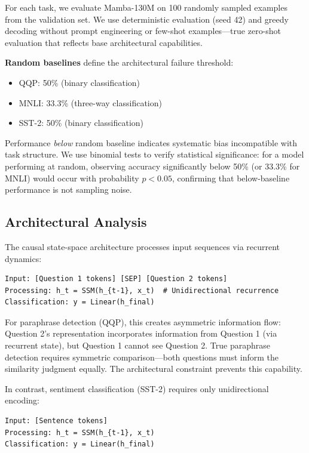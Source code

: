 For each task, we evaluate Mamba-130M on 100 randomly sampled examples from the validation set. We use deterministic evaluation (seed 42) and greedy decoding without prompt engineering or few-shot examples---true zero-shot evaluation that reflects base architectural capabilities.

\textbf{Random baselines} define the architectural failure threshold:
\begin{itemize}
\item QQP: 50\% (binary classification)
\item MNLI: 33.3\% (three-way classification)
\item SST-2: 50\% (binary classification)
\end{itemize}

Performance \textit{below} random baseline indicates systematic bias incompatible with task structure. We use binomial tests to verify statistical significance: for a model performing at random, observing accuracy significantly below 50\% (or 33.3\% for MNLI) would occur with probability $p < 0.05$, confirming that below-baseline performance is not sampling noise.

\subsection{Architectural Analysis}

The causal state-space architecture processes input sequences via recurrent dynamics:

\begin{verbatim}
Input: [Question 1 tokens] [SEP] [Question 2 tokens]
Processing: h_t = SSM(h_{t-1}, x_t)  # Unidirectional recurrence
Classification: y = Linear(h_final)
\end{verbatim}

For paraphrase detection (QQP), this creates asymmetric information flow: Question 2's representation incorporates information from Question 1 (via recurrent state), but Question 1 cannot see Question 2. True paraphrase detection requires symmetric comparison---both questions must inform the similarity judgment equally. The architectural constraint prevents this capability.

In contrast, sentiment classification (SST-2) requires only unidirectional encoding:

\begin{verbatim}
Input: [Sentence tokens]
Processing: h_t = SSM(h_{t-1}, x_t)
Classification: y = Linear(h_final)
\end{verbatim}

